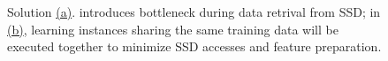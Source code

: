 \documentclass[conference]{IEEEtran}
\begin{document}
\begin{figure}[!htb] 
	
	
	\caption{\small 
		Solution \hyperref[dl_a]{(a)}. introduces bottleneck during data retrival from SSD; 
		in \hyperref[dl_b]{(b)}, learning instances sharing the same training data will be executed together to minimize SSD accesses and feature preparation. }
	\label{fig:dl}
\end{figure}
\end{document}
